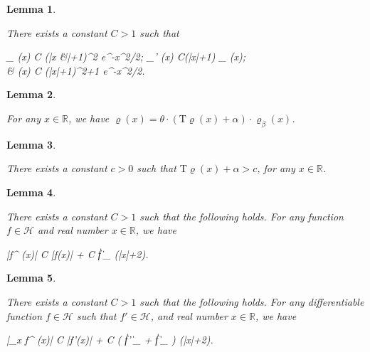 \documentclass[10pt,a4paper]{amsart}
\newtheorem{lem}{Lemma}
\DeclareMathOperator{\dr}{dr}
\begin{document}
	\begin{lem}
		
		\label{rhoexponential} 
		
		There exists a constant $C > 1$ such that 
		\begin{flalign}
			\label{estimate0} 
			\begin{aligned} 
			\varrho_{\beta} (x) \le C (|x &|+1)^{2 \theta} e^{-\beta x^2/2}; \qquad \varrho_{\beta}' (x) \le C(|x|+1) \varrho_{\beta} (x); \\
			& \varrho (x) \le C (|x|+1)^{2\theta+1} e^{-\beta x^2/2}.
			\end{aligned} 
		\end{flalign} 
	\end{lem} 

	\begin{lem}
		\label{rhorho} 
		
		For any $x \in \mathbb{R}$, we have $\varrho(x) = \theta \cdot ( \bm{\mathrm{T}} \varrho (x) + \alpha ) \cdot \varrho_{\beta} (x)$.
		
	\end{lem} 

	\begin{lem}
		\label{alphat}
		
		There exists a constant $c > 0$ such that $\bm{\mathrm{T}} \varrho (x) + \alpha > c$, for any $x \in \mathbb{R}$.
		
	\end{lem}

	\begin{lem} 
		\label{xf2} 
		
		There exists a constant $C>1$ such that the following holds. For any function $f \in \mathcal{H}$ and real number $x \in \mathbb{R}$, we have 
		\begin{flalign*} 
			|f^{\dr} (x)| \le C \cdot |f(x)| + C \| f \|_{} \cdot \log (|x|+2).
		\end{flalign*} 
		
	\end{lem} 

	\begin{lem} 
		\label{derivativefg}
		
		There exists a constant $C>1$ such that the following holds. For any differentiable function $f \in \mathcal{H}$ such that $f' \in \mathcal{H}$, and real number $x \in \mathbb{R}$, we have 
		\begin{flalign*}
			|\partial_x f^{\dr} (x)| \le C \cdot |f'(x)| + C (  \| f' \|_{} + \| f \|_{} ) \cdot \log (|x|+2).
		\end{flalign*} 
	\end{lem} 
\end{document}
